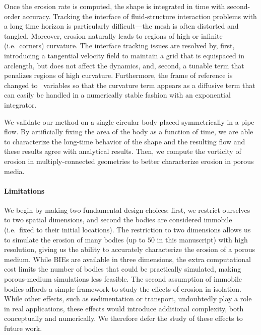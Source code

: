 \documentclass[preprint, 10pt]{elsarticle}
\begin{document}
Once the erosion rate is computed, the shape is integrated in time with
second-order accuracy.  Tracking the interface of fluid-structure
interaction problems with a long time horizon is particularly
difficult---the mesh is often distorted and tangled.  Moreover, erosion
naturally leads to regions of high or infinite (i.e.~corners) curvature.
The interface tracking issues are resolved by, first, introducing a
tangential velocity field to maintain a grid that is equispaced in
arclength, but does not affect the dynamics, and, second, a tunable term
that penalizes regions of high curvature.  Furthermore, the frame of
reference is changed to \thL~variables so that the curvature term
appears as a diffusive term that can easily be handled in a numerically
stable fashion with an exponential integrator.

We validate our method on a single circular body placed symmetrically in
a pipe flow.  By artificially fixing the area of the body as a function
of time, we are able to characterize the long-time behavior of the shape
and the resulting flow and these results agree with analytical results.
Then, we compute the vorticity of erosion in multiply-connected
geometries to better characterize erosion in porous media. 






\paragraph{Limitations} 
We begin by making two fundamental design choices: first, we restrict ourselves to two spatial dimensions, and second the bodies are considered immobile (i.e.~fixed to their initial locations). The restriction to two dimensions allows us to simulate the erosion of many bodies (up to $50$ in this manuscript) with high resolution, giving us the ability to accurately characterize the erosion of a porous medium. While BIEs are available in three dimensions, the extra computational cost limits the number of bodies that could be practically simulated, making porous-medium simulations less feasible. The second assumption of immobile bodies affords a simple framework to study the effects of erosion in isolation. While other effects, such as sedimentation or transport, undoubtedly play a role in real applications, these effects would introduce additional complexity, both conceptually and numerically. We therefore defer the study of these effects to future work.
\end{document}
